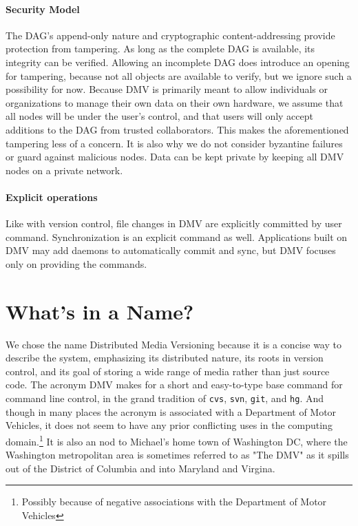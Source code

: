 \paragraph{Security Model}

The DAG's append-only nature and cryptographic content-addressing provide
protection from tampering. As long as the complete DAG is available, its
integrity can be verified. Allowing an incomplete DAG does introduce an opening
for tampering, because not all objects are available to verify, but we ignore
such a possibility for now. Because DMV is primarily meant to allow individuals
or organizations to manage their own data on their own hardware, we assume that
all nodes will be under the user's control, and that users will only accept
additions to the DAG from trusted collaborators. This makes the aforementioned
tampering less of a concern. It is also why we do not consider byzantine
failures or guard against malicious nodes. Data can be kept private by keeping
all DMV nodes on a private network.


\paragraph{Explicit operations}

Like with version control, file changes in DMV are explicitly committed by user
command. Synchronization is an explicit command as well. Applications built on
DMV may add daemons to automatically commit and sync, but DMV focuses only on
providing the commands.


\iffalse
\todo{Envisioned LS output}

\begin{lstlisting}[float,caption=Example ls output]
    -rw-r--r-- 1 user user  121306 Oct 21 18:28 local   filex
    -rw-r--r-- 1 user user   25475 Oct 21 17:52 100ms   filey
    -rw-r--r-- 1 user user   32031 Oct 21 17:52 20min   filez
    -rw-r--r-- 1 user user   74968 Oct 18 17:12 missing filexx
    -rw-r--r-- 1 user user   83977 Sep 22 21:23 unknown fileyy
\end{lstlisting}
\fi



\section{What's in a Name?}

We chose the name Distributed Media Versioning because it is a concise way to
describe the system, emphasizing its distributed nature, its roots in version
control, and its goal of storing a wide range of media rather than just source
code. The acronym DMV makes for a short and easy-to-type base command for
command line control, in the grand tradition of \lstinline{cvs},
\lstinline{svn}, \lstinline{git}, and \lstinline{hg}. And though in many places
the acronym is associated with a Department of Motor Vehicles, it does not seem
to have any prior conflicting uses in the computing domain.\footnote{Possibly
because of negative associations with the Department of Motor Vehicles} It is
also an nod to Michael's home town of Washington DC, where the Washington
metropolitan area is sometimes referred to as "The DMV" as it spills out of the
District of Columbia and into Maryland and Virgina.
